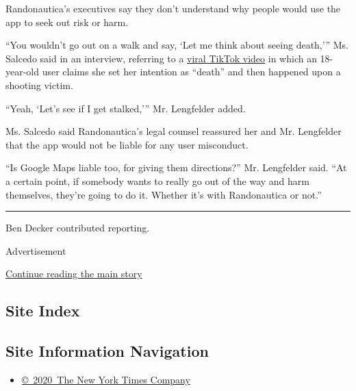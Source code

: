 Randonautica's executives say they don't understand why people would use
the app to seek out risk or harm.

``You wouldn't go out on a walk and say, `Let me think about seeing
death,''' Ms. Salcedo said in an interview, referring to a
\href{https://www.tiktok.com/@mykenarae/video/6842171161585945862}{viral
TikTok video} in which an 18-year-old user claims she set her intention
as ``death'' and then happened upon a shooting victim.

``Yeah, `Let's see if I get stalked,''' Mr. Lengfelder added.

Ms. Salcedo said Randonautica's legal counsel reassured her and Mr.
Lengfelder that the app would not be liable for any user misconduct.

``Is Google Maps liable too, for giving them directions?'' Mr.
Lengfelder said. ``At a certain point, if somebody wants to really go
out of the way and harm themselves, they're going to do it. Whether it's
with Randonautica or not.''

\begin{center}\rule{0.5\linewidth}{\linethickness}\end{center}

Ben Decker contributed reporting.

Advertisement

\protect\hyperlink{after-bottom}{Continue reading the main story}

\hypertarget{site-index}{%
\subsection{Site Index}\label{site-index}}

\hypertarget{site-information-navigation}{%
\subsection{Site Information
Navigation}\label{site-information-navigation}}

\begin{itemize}
\tightlist
\item
  \href{https://help.nytimes3xbfgragh.onion/hc/en-us/articles/115014792127-Copyright-notice}{©~2020~The
  New York Times Company}
\end{itemize}

